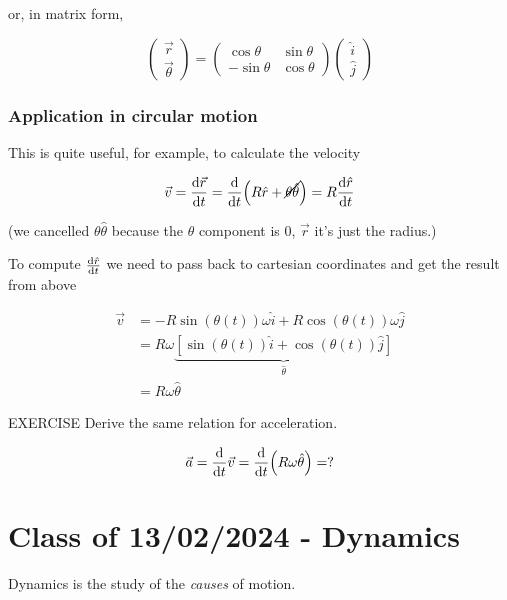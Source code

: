 \documentclass[10pt]{extarticle}
\begin{document}
or, in matrix form,

$$
  \begin{pmatrix}
    \vec r \\
    \vec \theta
  \end{pmatrix}
  =
  \begin{pmatrix}
    \cos \theta  & \sin \theta \\
    -\sin \theta & \cos \theta
  \end{pmatrix}
  \begin{pmatrix}
    \hat i \\
    \hat j
  \end{pmatrix}
$$

\subsubsection{Application in circular motion}

This is quite useful, for example, to calculate the velocity

$$
  \vec v = \dv {\vec r}{t} = \dv{t} (R \hat r + \cancel{\theta \hat \theta})
  = R \dv{\hat r}{t}
$$

(we cancelled $\theta \hat \theta$ because the $\theta$ component is 0, $\vec r$ it's just the radius.)

To compute $\dv{\hat r}{t}$ we need to pass back to cartesian coordinates and get the result from above

\begin{align*}
  \vec{v} & = - R \sin (\theta(t)) \omega \hat i + R \cos (\theta(t)) \omega \hat j                   \\
          & = R \omega \underbrace{[\sin (\theta(t)) \hat i + \cos (\theta(t)) \hat j]}_{\hat \theta} \\
          & = R \omega \hat \theta
\end{align*}

\begin{bluebox}{EXERCISE}
  Derive the same relation for acceleration.

  $$
    \vec{a} = \dv {t} \vec v = \dv{t}(R \omega \hat \theta) = ?
  $$
\end{bluebox}

\section{Class of 13/02/2024 - Dynamics}

Dynamics is the study of the \textit{causes} of motion.
\end{document}
